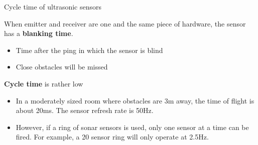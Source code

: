 \documentclass[compress]{beamer}
\begin{document}
\begin{frame}{Cycle time of ultrasonic sensors}

    When emitter and receiver are one and the same piece of hardware, the
    sensor has a \textbf{blanking time}.

    \begin{itemize}
        \item Time after the ping in which the sensor is blind
        \item Close obstacles will be missed
    \end{itemize}

    \textbf{Cycle time} is rather low

    \begin{itemize}
        \item In a moderately sized room where obstacles are 3m away, the time of
              flight is about 20ms. The sensor refresh rate is 50Hz.
        \item However, if a ring of sonar sensors is used, only one sensor at a time
              can be fired. For example, a 20 sensor ring will only operate at
              2.5Hz.
    \end{itemize}

\end{frame}
\end{document}
